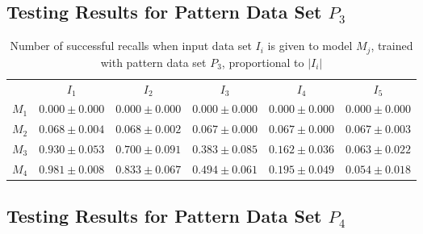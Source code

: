 \documentclass[anon]{CI}
\begin{document}
		\subsection{Testing Results for Pattern Data Set $P_{3}$}
		
		
		\begin{table}[H]
			\centering
			\def\arraystretch{1.5}
			\footnotesize
			\begin{tabular}{cccccc}
				
				& $I_{1}$  & $I_{2}$  & $I_{3}$  & $I_{4}$  & $I_{5}$ \\ \cline{2-6}
				$M_{1}$  & $0.000\pm0.000$  & $0.000\pm0.000$  & $0.000\pm0.000$  & $0.000\pm0.000$  & $0.000\pm0.000$ \\
				$M_{2}$  & $0.068\pm0.004$  & $0.068\pm0.002$  & $0.067\pm0.000$  & $0.067\pm0.000$  & $0.067\pm0.003$ \\
				$M_{3}$  & $0.930\pm0.053$  & $0.700\pm0.091$  & $0.383\pm0.085$  & $0.162\pm0.036$  & $0.063\pm0.022$ \\
				$M_{4}$  & $0.981\pm0.008$  & $0.833\pm0.067$  & $0.494\pm0.061$  & $0.195\pm0.049$  & $0.054\pm0.018$ \\
				
			\end{tabular}
			\caption{Number of successful recalls when input data set $I_i$ is given to model $M_j$, trained with pattern data set $P_{3}$, proportional to $\left|I_i\right|$}
		\end{table}
		
		\subsection{Testing Results for Pattern Data Set $P_{4}$}
		
		
\end{document}
